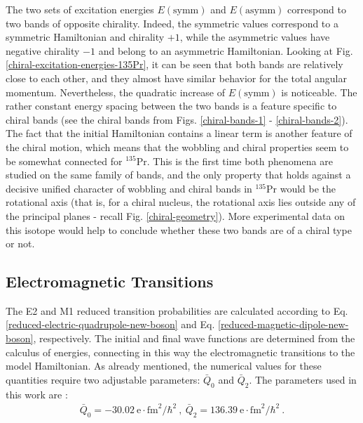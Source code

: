 The two sets of excitation energies $E(\text{symm})$ and $E(\text{asymm})$ correspond to two bands of opposite chirality. Indeed, the symmetric values correspond to a symmetric Hamiltonian and chirality $+1$, while the asymmetric values have negative chirality $-1$ and belong to an asymmetric Hamiltonian. Looking at Fig. \ref{chiral-excitation-energies-135Pr}, it can be seen that both bands are relatively close to each other, and they almost have similar behavior for the total angular momentum. Nevertheless, the quadratic increase of $E(\text{symm})$ is noticeable. The rather constant energy spacing between the two bands is a feature specific to chiral bands \cite{raduta2020new} (see the chiral bands from Figs. \ref{chiral-bands-1} - \ref{chiral-bands-2}). The fact that the initial Hamiltonian contains a linear term is another feature of the chiral motion, which means that the wobbling and chiral properties seem to be somewhat connected for $^{135}$Pr. This is the first time both phenomena are studied on the same family of bands, and the only property that holds against a decisive unified character of wobbling and chiral bands in $^{135}$Pr would be the rotational axis (that is, for a chiral nucleus, the rotational axis lies outside any of the principal planes - recall Fig. \ref{chiral-geometry}). More experimental data on this isotope would help to conclude whether these two bands are of a chiral type or not. 
\subsection{Electromagnetic Transitions}

The E2 and M1 reduced transition probabilities are calculated according to Eq. \ref{reduced-electric-quadrupole-new-boson} and Eq. \ref{reduced-magnetic-dipole-new-boson}, respectively. The initial and final wave functions are determined from the calculus of energies, connecting in this way the electromagnetic transitions to the model Hamiltonian. As already mentioned, the numerical values for these quantities require two adjustable parameters: $\bar{Q}_0$ and $\bar{Q}_2$. The parameters used in this work are \cite{raduta2020new}:
\begin{align}
    \bar{Q}_0=-30.02\ \mathrm{e}\cdot\text{fm}^2/\hbar^2\ ,\ \bar{Q}_2=136.39\ \mathrm{e}\cdot\text{fm}^2/\hbar^2\ .
\end{align}

